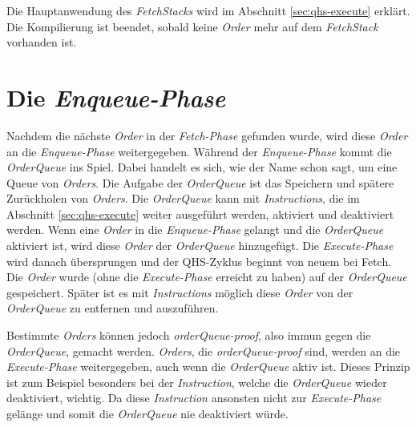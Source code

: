 
%
%
Die Hauptanwendung des \textit{FetchStacks} wird im Abschnitt \ref{sec:qhs-execute} erklärt.
Die Kompilierung ist beendet, sobald keine \textit{Order} mehr auf dem \textit{FetchStack} vorhanden ist.

\section{Die \textit{Enqueue-Phase}} \label{sec:qhs-Enqueue}
Nachdem die nächste \textit{Order} in der  \textit{Fetch-Phase} gefunden wurde, wird diese \textit{Order} an die \textit{Enqueue-Phase} weitergegeben. Während der \textit{Enqueue-Phase} kommt die \textit{OrderQueue} ins Spiel.
Dabei handelt es sich, wie der Name schon sagt, um eine Queue von \textit{Orders}.
Die Aufgabe der \textit{OrderQueue} ist das Speichern und spätere Zurückholen von \textit{Orders}.
Die \textit{OrderQueue} kann mit \textit{Instructions}, die im Abschnitt \ref{sec:qhs-execute} weiter ausgeführt werden, aktiviert und deaktiviert werden.
Wenn eine \textit{Order} in die \textit{Enqueue-Phase} gelangt und die \textit{OrderQueue} aktiviert ist, wird diese \textit{Order} der \textit{OrderQueue} hinzugefügt.
Die \textit{Execute-Phase} wird danach übersprungen und der QHS-Zyklus beginnt von neuem bei Fetch.
Die \textit{Order} wurde (ohne die \textit{Execute-Phase} erreicht zu haben) auf der \textit{OrderQueue} gespeichert.
Später ist es mit \textit{Instructions} möglich diese \textit{Order} von der \textit{OrderQueue} zu entfernen und auszuführen.

Bestimmte \textit{Orders} können jedoch \textit{orderQueue-proof}, also immun gegen die \textit{OrderQueue}, gemacht werden.
\textit{Orders}, die \textit{orderQueue-proof} sind, werden an die \textit{Execute-Phase} weitergegeben, auch wenn die \textit{OrderQueue} aktiv ist.
Dieses Prinzip ist zum Beispiel besonders bei der \textit{Instruction}, welche die \textit{OrderQueue} wieder deaktiviert, wichtig.
Da diese \textit{Instruction} ansonsten nicht zur \textit{Execute-Phase} gelänge und somit die \textit{OrderQueue} nie deaktiviert würde.


